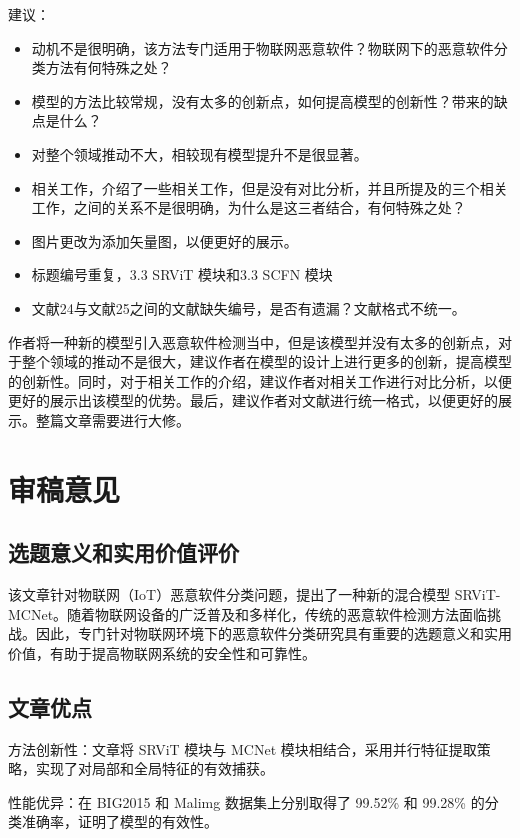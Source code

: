 \documentclass[11pt,a4paper]{article}
\begin{document}
\noindent 建议：
\begin{itemize}
  \item 动机不是很明确，该方法专门适用于物联网恶意软件？物联网下的恶意软件分类方法有何特殊之处？
  \item 模型的方法比较常规，没有太多的创新点，如何提高模型的创新性？带来的缺点是什么？
  \item 对整个领域推动不大，相较现有模型提升不是很显著。
  \item 相关工作，介绍了一些相关工作，但是没有对比分析，并且所提及的三个相关工作，之间的关系不是很明确，为什么是这三者结合，有何特殊之处？
  \item 图片更改为添加矢量图，以便更好的展示。
  \item 标题编号重复，3.3 SRViT 模块和3.3 SCFN 模块
  \item 文献24与文献25之间的文献缺失编号，是否有遗漏？文献格式不统一。
\end{itemize}

作者将一种新的模型引入恶意软件检测当中，但是该模型并没有太多的创新点，对于整个领域的推动不是很大，建议作者在模型的设计上进行更多的创新，提高模型的创新性。同时，对于相关工作的介绍，建议作者对相关工作进行对比分析，以便更好的展示出该模型的优势。最后，建议作者对文献进行统一格式，以便更好的展示。整篇文章需要进行大修。


\section{审稿意见}

\subsection{选题意义和实用价值评价}

该文章针对物联网（IoT）恶意软件分类问题，提出了一种新的混合模型 SRViT-MCNet。随着物联网设备的广泛普及和多样化，传统的恶意软件检测方法面临挑战。因此，专门针对物联网环境下的恶意软件分类研究具有重要的选题意义和实用价值，有助于提高物联网系统的安全性和可靠性。

\subsection{文章优点}

方法创新性：文章将 SRViT 模块与 MCNet 模块相结合，采用并行特征提取策略，实现了对局部和全局特征的有效捕获。

性能优异：在 BIG2015 和 Malimg 数据集上分别取得了 99.52\% 和 99.28\% 的分类准确率，证明了模型的有效性。
\end{document}
